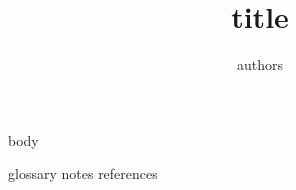 \documentclass[12pt]{ctexart}
\begin{document}
\title{{{title}}}
\author{{{authors}}}
\date{}
\maketitle

{{body}}

{{glossary}}
{{notes}}
{{references}}
\end{document}
